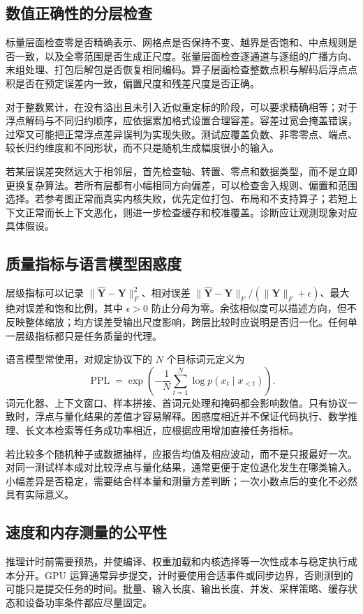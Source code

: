 \documentclass[UTF8,12pt,a4paper,fontset=fandol]{ctexart}
\begin{document}
\subsection{数值正确性的分层检查}
标量层面检查零是否精确表示、网格点是否保持不变、越界是否饱和、中点规则是否一致，以及全零范围是否生成正尺度。张量层面检查逐通道与逐组的广播方向、末组处理、打包后解包是否恢复相同编码。算子层面检查整数点积与解码后浮点点积是否在预定误差内一致，偏置尺度和残差尺度是否正确。

对于整数累计，在没有溢出且未引入近似重定标的阶段，可以要求精确相等；对于浮点解码与不同归约顺序，应依据累加格式设置合理容差。容差过宽会掩盖错误，过窄又可能把正常浮点差异误判为实现失败。测试应覆盖负数、非零零点、端点、较长归约维度和不同形状，而不只是随机生成幅度很小的输入。

若某层误差突然远大于相邻层，首先检查轴、转置、零点和数据类型，而不是立即更换复杂算法。若所有层都有小幅相同方向偏差，可以检查舍入规则、偏置和范围选择。若参考图正常而真实内核失败，优先定位打包、布局和不支持算子；若短上下文正常而长上下文恶化，则进一步检查缓存和校准覆盖。诊断应让观测现象对应具体假设。

\subsection{质量指标与语言模型困惑度}
层级指标可以记录 $\|\widehat{\mathbf Y}-\mathbf Y\|_F^2$、相对误差 $\|\widehat{\mathbf Y}-\mathbf Y\|_F/(\|\mathbf Y\|_F+\epsilon)$、最大绝对误差和饱和比例，其中 $\epsilon>0$ 防止分母为零。余弦相似度可以描述方向，但不反映整体缩放；均方误差受输出尺度影响，跨层比较时应说明是否归一化。任何单一层级指标都只是任务质量的代理。

语言模型常使用，对规定协议下的 $N$ 个目标词元定义为
\begin{equation}
 \operatorname{PPL}=\exp\!\left(-\frac1N\sum_{t=1}^N
 \log p(x_t\mid x_{<t})\right).
 \label{eq:quant-ppl}
\end{equation}
词元化器、上下文窗口、样本拼接、首词元处理和掩码都会影响数值。只有协议一致时，浮点与量化结果的差值才容易解释。困惑度相近并不保证代码执行、数学推理、长文本检索等任务成功率相近，应根据应用增加直接任务指标。

若比较多个随机种子或数据抽样，应报告均值及相应波动，而不是只报最好一次。对同一测试样本成对比较浮点与量化结果，通常更便于定位退化发生在哪类输入。小幅差异是否稳定，需要结合样本量和测量方差判断；一次小数点后的变化不必然具有实际意义。

\subsection{速度和内存测量的公平性}
推理计时前需要预热，并使编译、权重加载和内核选择等一次性成本与稳定执行成本分开。GPU 运算通常异步提交，计时要使用合适事件或同步边界，否则测到的可能只是提交任务的时间。批量、输入长度、输出长度、并发、采样策略、缓存状态和设备功率条件都应尽量固定。
\end{document}
